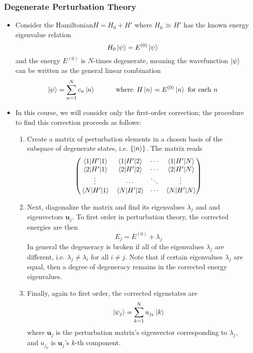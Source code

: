 \documentclass[11pt, a4paper]{article}
\newcommand{\Ham}{Hamiltonian\xspace}
\renewcommand{\vec}[1]{\bm{#1}} %
\newcommand{\p}{\psi}  %
\begin{document}
\subsubsection{Degenerate Perturbation Theory}
\begin{itemize}
	\item Consider the \Ham $ H = H_{0} + H' $ where $ H_{0} \gg H' $ has the known energy eigenvalue relation
	\begin{equation*}
		H_{0} \ket{\psi}  = E^{(0)} \ket{\psi}
	\end{equation*}
	and the energy $ E^{(0)} $ is $ N $-times degenerate, meaning the wavefunction $ \ket{\p} $ can be written as the general linear combination
	\begin{equation*}
		\ket{\psi} = \sum_{n=1}^{N}c_{n}\ket{n} \qquad \quad \text{where} \ \, H\ket{n} = E^{(0)} \ket{n} \ \text{for each } n
	\end{equation*}
	\item In this course, we will consider only the first-order correction; the procedure to find this correction proceeds as follows:
	\begin{enumerate}
		\item Create a matrix of perturbation elements in a chosen basis of the subspace of degenerate states, i.e. $ \{\ket{n}\} $. The matrix reads
		\begin{equation*}
			\begin{pmatrix}
				\mel{1}{H'}{1} & \mel{1}{H'}{2} &  \cdots & \mel{1}{H'}{N} \\
				\mel{2}{H'}{1} & \mel{2}{H'}{2} &  \cdots & \mel{2}{H'}{N} \\
				\vdots & \cdots & \ddots & \vdots\\
				\mel{N}{H'}{1} & \mel{N}{H'}{2} &  \cdots & \mel{N}{H'}{N} 
			\end{pmatrix}
		\end{equation*}
		
		\item Next, diagonalize the matrix and find its eigenvalues $ \lambda_{j} $ and and eigenvectors $ \vec{u}_{j} $. To first order in perturbation theory, the corrected energies are then
		\begin{equation*}
			E_{j} = E^{(0)} + \lambda_{j} 
		\end{equation*}
		In general the degeneracy is broken if all of the eigenvalues $ \lambda_{j} $ are different, i.e. $ \lambda_{j} \neq \lambda_{i} $ for all $ i \neq j $. Note that if certain eigenvalues $ \lambda_{j} $ are equal, then a degree of degeneracy remains in the corrected energy eigenvalues.
		
		\item Finally, again to first order, the corrected eigenstates are 
		\begin{equation*}
			\ket{\p_{j}} = \sum_{k=1}^{N}u_{j_{k}} \ket{k}
		\end{equation*}
		where $ \vec{u}_{j} $ is the perturbation matrix's eigenvector corresponding to $ \lambda_{j} $, and $ u_{j_{k}} $ is $ \vec{u}_{j} $'s $ k $-th component.
	\end{enumerate}
\end{itemize}
\end{document}
